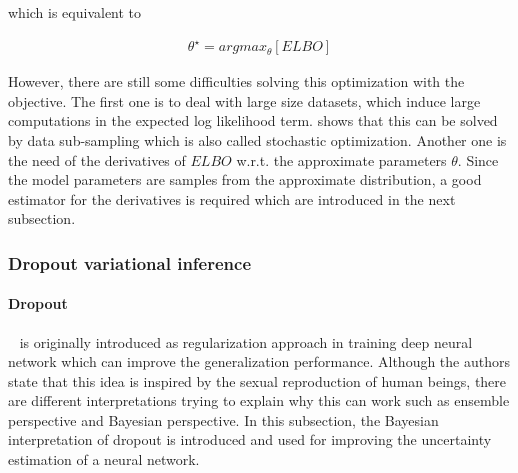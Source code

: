 which is equivalent to 

\begin{equation}\label{2.9}	
\begin{aligned}
\theta^{\star} = argmax_{\theta} [ELBO]
\end{aligned}
\end{equation}

However, there are still some difficulties solving this optimization with the objective. The first one is to deal with large size datasets, which induce large computations in the expected log likelihood term. \cite{graves2011practical} shows  that this can be solved by data sub-sampling which is also called stochastic optimization. Another one is the need of the derivatives of $ELBO$ w.r.t. the approximate parameters $\theta$. Since the model parameters are samples from the approximate distribution, a good estimator for the derivatives is required which are introduced in the next subsection. 

\subsubsection{Dropout variational inference}
\paragraph{Dropout}~\cite{srivastava2014dropout} is originally introduced as regularization approach in training deep neural network  which can improve the generalization performance. 
Although the authors state that this idea is inspired by the sexual reproduction of human beings, there are different interpretations trying to explain why this can work such as ensemble perspective and Bayesian perspective. 
In this subsection, the Bayesian interpretation of dropout is introduced and used for improving the uncertainty estimation of a neural network. 


